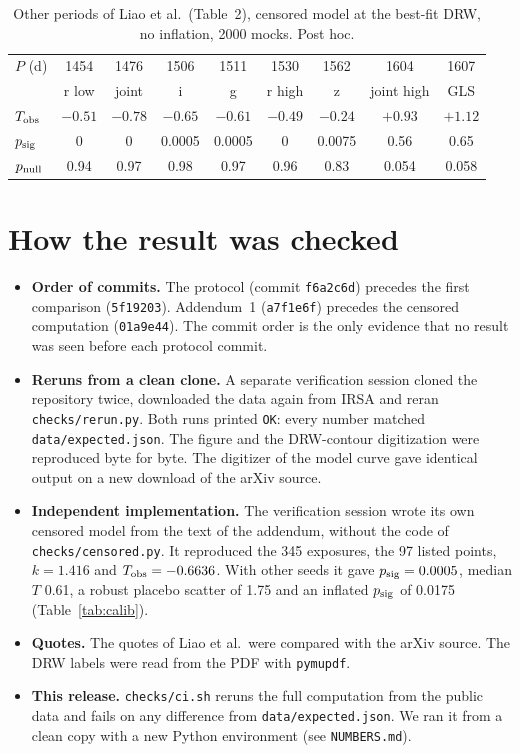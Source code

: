 \documentclass[11pt]{article}
\newcommand{\Tobs}{T_{\rm obs}}
\newcommand{\psig}{p_{\rm sig}}
\newcommand{\pnull}{p_{\rm null}}
\begin{document}
\begin{table}[t]
\centering
\caption{Other periods of Liao et al.\ (Table~2), censored model at the best-fit DRW, no inflation, 2000 mocks. Post hoc.}
\label{tab:periods}
\begin{tabular}{lcccccccc}
\toprule
$P$ (d) & 1454 & 1476 & 1506 & 1511 & 1530 & 1562 & 1604 & 1607 \\
 & r low & joint & i & g & r high & z & joint high & GLS \\
\midrule
$\Tobs$ & $-0.51$ & $-0.78$ & $-0.65$ & $-0.61$ & $-0.49$ & $-0.24$ & $+0.93$ & $+1.12$ \\
$\psig$ & 0 & 0 & 0.0005 & 0.0005 & 0 & 0.0075 & 0.56 & 0.65 \\
$\pnull$ & 0.94 & 0.97 & 0.98 & 0.97 & 0.96 & 0.83 & 0.054 & 0.058 \\
\bottomrule
\end{tabular}
\end{table}

\section{How the result was checked}
\begin{itemize}
\item \textbf{Order of commits.} The protocol (commit \texttt{f6a2c6d}) precedes the first comparison (\texttt{5f19203}). Addendum~1 (\texttt{a7f1e6f}) precedes the censored computation (\texttt{01a9e44}). The commit order is the only evidence that no result was seen before each protocol commit.
\item \textbf{Reruns from a clean clone.} A separate verification session cloned the repository twice, downloaded the data again from IRSA and reran \texttt{checks/rerun.py}. Both runs printed \texttt{OK}: every number matched \texttt{data/expected.json}. The figure and the DRW-contour digitization were reproduced byte for byte. The digitizer of the model curve gave identical output on a new download of the arXiv source.
\item \textbf{Independent implementation.} The verification session wrote its own censored model from the text of the addendum, without the code of \texttt{checks/censored.py}. It reproduced the 345 exposures, the 97 listed points, $k = 1.416$ and $\Tobs = -0.6636$. With other seeds it gave $\psig = 0.0005$, median $T$ 0.61, a robust placebo scatter of 1.75 and an inflated $\psig$ of 0.0175 (Table~\ref{tab:calib}).
\item \textbf{Quotes.} The quotes of Liao et al.\ were compared with the arXiv source. The DRW labels were read from the PDF with \texttt{pymupdf}.
\item \textbf{This release.} \texttt{checks/ci.sh} reruns the full computation from the public data and fails on any difference from \texttt{data/expected.json}. We ran it from a clean copy with a new Python environment (see \texttt{NUMBERS.md}).
\end{itemize}
\end{document}
